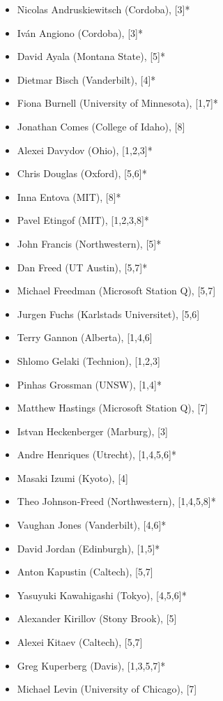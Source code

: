\documentclass[11pt]{article}
\begin{document}
\begin{multicols}{2}
\begin{itemize}
  \setlength{\itemsep}{1pt}
  \setlength{\parskip}{0pt}
  \setlength{\parsep}{0pt}
\item Nicolas Andruskiewitsch (Cordoba), [3]*
\item Iv\'an Angiono (Cordoba), [3]*
\item David Ayala (Montana State), [5]*
\item Dietmar Bisch (Vanderbilt), [4]*
\item Fiona Burnell (University of Minnesota), [1,7]*
\item Jonathan Comes (College of Idaho), [8]
\item Alexei Davydov (Ohio), [1,2,3]*
\item Chris Douglas (Oxford), [5,6]*
\item Inna Entova (MIT), [8]*
\item Pavel Etingof (MIT), [1,2,3,8]*
\item John Francis (Northwestern), [5]*
\item Dan Freed (UT Austin), [5,7]*
\item Michael Freedman (Microsoft Station Q), [5,7]
\item Jurgen Fuchs (Karlstads Universitet), [5,6]
\item Terry Gannon (Alberta), [1,4,6]
\item Shlomo Gelaki (Technion), [1,2,3]
\item Pinhas Grossman (UNSW), [1,4]*
\item Matthew Hastings (Microsoft Station Q), [7]
\item Istvan Heckenberger (Marburg), [3]
\item Andre Henriques (Utrecht), [1,4,5,6]*
\item Masaki Izumi (Kyoto), [4]
\item Theo Johnson-Freed (Northwestern), [1,4,5,8]*
\item Vaughan Jones (Vanderbilt), [4,6]*
\item David Jordan (Edinburgh), [1,5]*
\item Anton Kapustin (Caltech), [5,7]
\item Yasuyuki Kawahigashi (Tokyo), [4,5,6]*
\item Alexander Kirillov (Stony Brook), [5]
\item Alexei Kitaev (Caltech), [5,7]
\item Greg Kuperberg (Davis), [1,3,5,7]*
\item Michael Levin (University of Chicago), [7]

\end{itemize}
\end{multicols}
\end{document}
